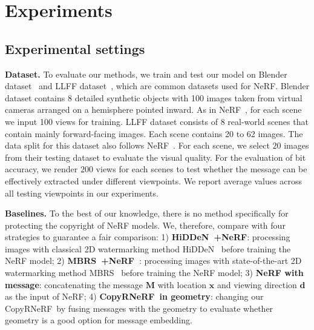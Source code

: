 \documentclass[10pt,twocolumn,letterpaper]{article}
\def\CopyNeRF{CopyRNeRF~}
\begin{document}
\section{Experiments}
\subsection{Experimental settings}
\noindent\textbf{Dataset.} To evaluate our methods, we train and test our model on Blender dataset~\cite{nerf2020} and LLFF dataset~\cite{mildenhall2019local}, which are common datasets used for NeRF. Blender dataset contains 8 detailed synthetic objects with 100 images taken from virtual cameras arranged on a hemisphere pointed inward. As in NeRF~\cite{nerf2020}, for each scene we input 100 views for training. LLFF dataset consists of 8 real-world scenes that contain mainly forward-facing images. Each scene contains 20 to 62 images. The data split for this dataset also follows NeRF~\cite{nerf2020}. For each scene, we select $20$ images from their testing dataset to evaluate the visual quality. For the evaluation of bit accuracy, we render $200$ views for each scenes to test whether the message can be effectively extracted under different viewpoints. We report average values across all testing viewpoints in our experiments.

\noindent\textbf{Baselines.} To the best of our knowledge, there is no method specifically for protecting the copyright of NeRF models. We, therefore, compare with four strategies to guarantee a fair comparison: 1) \textbf{HiDDeN~\cite{zhu2018hidden}+NeRF\cite{nerf2020}}: processing images with classical 2D watermarking method HiDDeN~\cite{zhu2018hidden} before training the NeRF model; 2) \textbf{MBRS~\cite{jia2021mbrs}+NeRF~\cite{nerf2020}}: processing images with state-of-the-art 2D watermarking method MBRS~\cite{jia2021mbrs} before training the NeRF model; 3) \textbf{NeRF with message}: concatenating the message $\mathbf{M}$ with location $\mathbf{x}$ and viewing direction $\mathbf{d}$ as the input of NeRF; 4) \textbf{\CopyNeRF in geometry}: changing our \CopyNeRF by fusing messages with the geometry to evaluate whether geometry is a good option for message embedding. %

\end{document}
